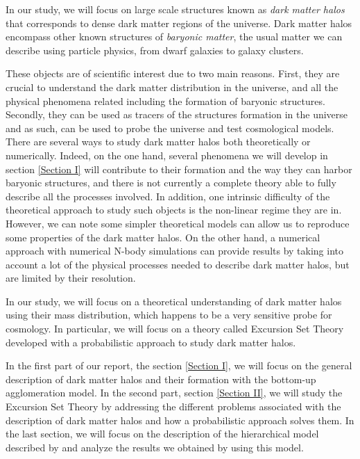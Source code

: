In our study, we will focus on large scale structures known as \textit{dark matter halos} that corresponds to dense dark matter regions of the universe. Dark matter halos encompass other known structures of \textit{baryonic matter}, the usual matter we can describe using particle physics, from dwarf galaxies to galaxy clusters.

These objects are of scientific interest due to two main reasons. First, they are crucial to understand the dark matter distribution in the universe, and all the physical phenomena related including the formation of baryonic structures. Secondly, they can be used as tracers of the structures formation in the universe and as such, can be used to probe the universe and test cosmological models. There are several ways to study dark matter halos both theoretically or numerically. Indeed, on the one hand, several phenomena we will develop in section \ref{Section I} will contribute to their formation and the way they can harbor baryonic structures, and there is not currently a complete theory able to fully describe all the processes involved. In addition, one intrinsic difficulty of the theoretical approach to study such objects is the non-linear regime they are in. However, we can note some simpler theoretical models can allow us to reproduce some properties of the dark matter halos\cite{Zentner}. On the other hand, a numerical approach with numerical N-body simulations can provide results by taking into account a lot of the physical processes needed to describe dark matter halos, but are limited by their resolution.

In our study, we will focus on a theoretical understanding of dark matter halos using their mass distribution, which happens to be a very sensitive probe for cosmology. In particular, we will focus on a theory called Excursion Set Theory \cite{Bond} developed with a probabilistic approach to study dark matter halos.

In the first part of our report, the section \ref{Section I}, we will focus on the general description of dark matter halos and their formation with the bottom-up agglomeration model. In the second part, section \ref{Section II}, we will study the Excursion Set Theory by addressing the different problems associated with the description of dark matter halos and how a probabilistic approach solves them. In the last section, we will focus on the description of the hierarchical model described by \cite{LaC} and analyze the results we obtained by using this model.



